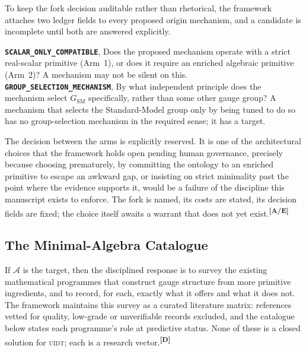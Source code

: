 \documentclass[12pt,a4paper,twoside]{article}
\theoremstyle{plain}
\theoremstyle{definition}
\theoremstyle{remark}
\newcommand{\UIDT}{\textsc{uidt}}
\newcommand{\catmark}[1]{\textsuperscript{\textsf{\textbf{[#1]}}}}
\begin{document}
\noindent To keep the fork decision auditable rather than rhetorical, the framework attaches two ledger fields to every proposed origin mechanism, and a candidate is incomplete until both are answered explicitly.

\begin{governancebox}
\textbf{\texttt{SCALAR\_ONLY\_COMPATIBLE}}, Does the proposed mechanism operate with a strict real-scalar primitive (Arm~1), or does it require an enriched
algebraic primitive (Arm~2)? A mechanism may not be silent on this.\\[0.4em]
\textbf{\texttt{GROUP\_SELECTION\_MECHANISM}}, By what independent principle does the mechanism select $G_{\mathrm{SM}}$ specifically, rather than some other gauge group? A mechanism that selects the Standard-Model group only by being tuned to do so has no group-selection mechanism in the required sense; it has a target.
\end{governancebox}

\noindent The decision between the arms is explicitly reserved. It is one of the architectural choices that the framework holds open pending human governance, precisely because choosing prematurely, by committing the ontology to an enriched primitive to escape an awkward gap, or insisting on strict minimality past the point where the evidence supports it, would be a failure of the discipline this manuscript exists to enforce. The fork is named, its costs are stated, its decision fields are fixed; the choice itself awaits a warrant that does not yet exist.\catmark{A/E}

\subsection{The Minimal-Algebra Catalogue}
\label{subsec:minimal-algebra-catalogue}

If $\mathcal{A}$ is the target, then the disciplined response is to survey the existing mathematical programmes that construct gauge structure from more primitive ingredients, and to record, for each, exactly what it offers and what it does not. The framework maintains this survey as a curated literature matrix: references vetted for quality, low-grade or unverifiable records excluded, and the catalogue below states each programme's role at predictive status. None of these is a closed solution for \UIDT; each is a research vector.\catmark{D}
\end{document}

